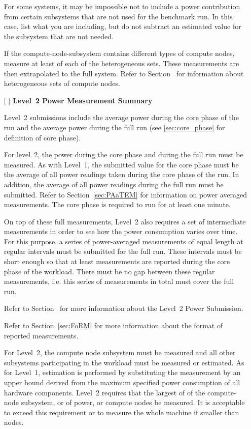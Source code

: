 \begin{itemize}
For some systems, it may be impossible not to include a power contribution from certain subsystems that are not used for the benchmark run.
In this case, list what you are including, but do not subtract an estimated value for the subsystem that are not needed.

If the compute-node-subsystem contains different types of compute nodes, measure at least \SpecFracMinLOne{} of each of the heterogeneous sets.
These measurements are then extrapolated to the full system.
Refer to Section~ for information about heterogeneous sets of compute nodes.

\newpage
\item[{[ ]}]
\textbf{Level~2 Power Measurement Summary}

Level~2 submissions include the average power during the core phase of the run and the average power during the full run (see \ref{sec:core_phase} for definition of core phase).

For level~2, the power during the core phase and during the full run must be measured.
As with Level~1, the submitted value for the core phase must be the average of all power readings taken during the core phase of the run.
In addition, the average of all power readings during the full run must be submitted.
Refer to Section~\ref{sec:PAaTEM} for information on power averaged measurements.
The core phase is required to run for at least one minute.

On top of these full measurements, Level~2 also requires a set of intermediate measurements in order to see how the power consumption varies over time.
For this purpose, a series of power-averaged measurements of equal length at regular intervals must be submitted for the full run.
These intervals must be short enough so that at least \MinMeasurementsCorePhaseLTwoThree{} measurements are reported during the core phase of the workload.
There must be no gap between these regular measurements, i.e. this series of measurements in total must cover the full run.

Refer to Section~ for more information about the Level~2 Power Submission.

Refer to Section~\ref{sec:FoRM} for more information about the format of reported measurements.

For Level~2, the compute node subsystem must be measured and all other subsystems participating in the workload must be measured or estimated.
As for Level~1, estimation is performed by substituting the measurement by an upper bound derived from the maximum specified power consumption of all hardware components.
Level~2 requires that the largest of \SpecFracMinLTwo{} of the compute-node subsystem, or \SpecPowerMinLTwo{} of power, or \SpecMinNodes{} compute nodes be measured.
It is acceptable to exceed this requirement or to measure the whole machine if smaller than \SpecMinNodes{} nodes.


\end{itemize}
